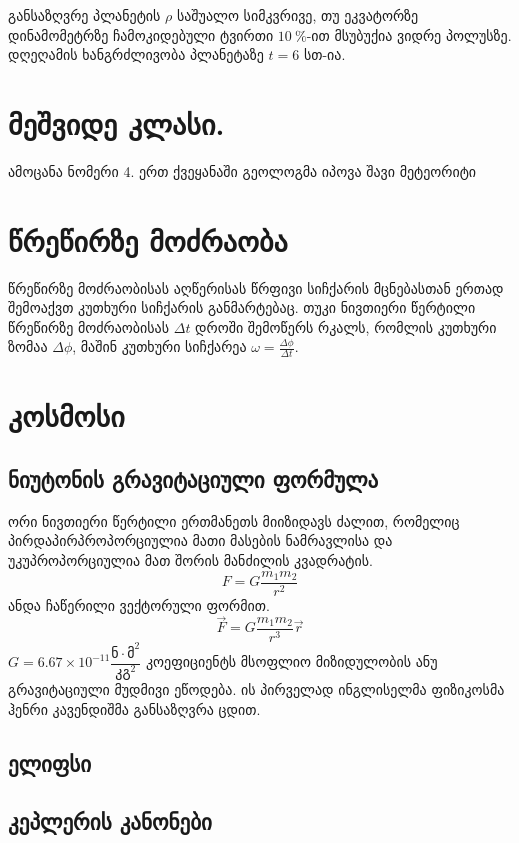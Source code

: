 \documentclass[a4paper]{book}
\begin{document}
განსაზღვრე პლანეტის $\rho$ საშუალო სიმკვრივე, თუ ეკვატორზე დინამომეტრზე ჩამოკიდებული ტვირთი $10~\%$-ით მსუბუქია ვიდრე პოლუსზე. დღეღამის ხანგრძლივობა პლანეტაზე $t = 6$ სთ-ია.

\section{მეშვიდე კლასი.}
ამოცანა ნომერი 4. ერთ ქვეყანაში გეოლოგმა იპოვა შავი მეტეორიტი
	 
\section{წრეწირზე მოძრაობა}
წრეწირზე მოძრაობისას აღწერისას წრფივი სიჩქარის მცნებასთან ერთად შემოაქვთ კუთხური სიჩქარის განმარტებაც. თუკი ნივთიერი წერტილი წრეწირზე მოძრაობისას $\Delta t$ დროში შემოწერს რკალს, რომლის კუთხური ზომაა $\Delta \phi$, მაშინ კუთხური სიჩქარეა $\omega = \frac{\Delta \phi}{\Delta t}$.

\section{კოსმოსი}
\subsection{ნიუტონის გრავიტაციული ფორმულა}
ორი ნივთიერი წერტილი ერთმანეთს მიიზიდავს ძალით, რომელიც პირდაპირპროპორციულია მათი მასების ნამრავლისა და უკუპროპორციულია მათ შორის მანძილის კვადრატის.
	\begin{equation}
		F = G\frac{m_1 m_2}{r^2}
	\end{equation}
ანდა ჩაწერილი ვექტორული ფორმით.
	\begin{equation}
		\vec{F} = G\frac{m_1 m_2}{r^3}\vec{r}
	\end{equation}
$G = 6.67 \times 10^{-11} \dfrac{\text{ნ}\cdot\text{მ}^2}{\text{კგ}^2}$ კოეფიციენტს მსოფლიო მიზიდულობის ანუ გრავიტაციული მუდმივი ეწოდება.
ის პირველად ინგლისელმა ფიზიკოსმა ჰენრი კავენდიშმა განსაზღვრა ცდით.

\subsection{ელიფსი}%


\subsection{კეპლერის კანონები}%
\end{document}
